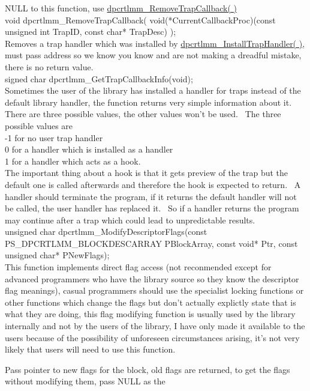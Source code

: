 \documentclass{article}
\begin{document}
NULL to this function, use \href{#RemoveTrapCallback}{dpcrtlmm\_RemoveTrapCallback(
)}
\\
void dpcrtlmm\_RemoveTrapCallback(
void(*CurrentCallbackProc)(const
unsigned int TrapID, const char* TrapDesc) );
\\
Removes a trap handler which was installed by \href{#InstallTrapCallback}{dpcrtlmm\_InstallTrapHandler(
)}, must pass address so we know you know and are not making a
dreadful
mistake, there is no return value.
\\
signed char dpcrtlmm\_GetTrapCallbackInfo(void);
\\
Sometimes the user of the library has installed a handler for traps
instead of the default library handler, the function returns very
simple
information about it.~ There are three possible values, the other
values won't be used.~ The three possible values are
\\
-1 for no user trap handler
\\
0 for a handler which is installed as a handler
\\
1 for a handler which acts as a hook.
\\
The important thing about a hook is that it gets preview of the trap
but the default one is called afterwards and therefore the hook is
expected
to return.~ A handler should terminate the program, if it returns
the default handler will not be called, the user handler has replaced
it.~
So if a handler returns the program may continue after a trap which
could
lead to unpredictable results.
\\
unsigned char
dpcrtlmm\_ModifyDescriptorFlags(const
PS\_DPCRTLMM\_BLOCKDESCARRAY PBlockArray, const void* Ptr, const unsigned
char* PNewFlags);
\\
This function implements direct flag access (not reconmended except
for advanced programmers who have the library source so they know the
descriptor
flag meanings), casual programmers should use the specialist locking
functions
or other functions which change the flags but don't actually explictly
state that is what they are doing, this flag modifying function is
usually
used by the library internally and not by the users of the library, I
have
only made it available to the users because of the possibility of
unforeseen
circumstances arising, it's not very likely that users will need to use
this function.
\par Pass pointer to new flags for the block, old flags are returned, to
get the flags without modifying them, pass NULL as the
\\
\end{document}
